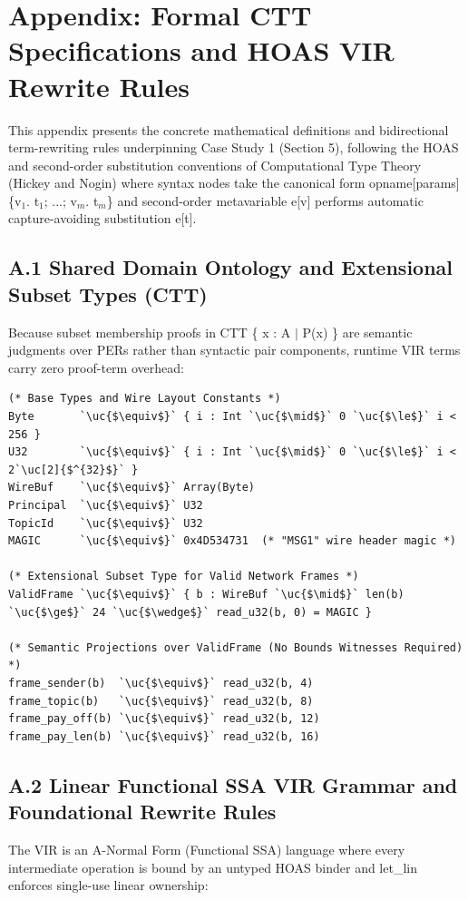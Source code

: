 \section*{Appendix: Formal CTT Specifications and HOAS VIR Rewrite Rules}
This appendix presents the concrete mathematical definitions and bidirectional term-rewriting rules underpinning Case Study 1 (Section 5), following the HOAS and second-order substitution conventions of Computational Type Theory (Hickey and Nogin) where syntax nodes take the canonical form opname[params]\{v\ensuremath{_{1}}. t\ensuremath{_{1}}; ...; v\ensuremath{_{m}}. t\ensuremath{_{m}}\} and second-order metavariable e[v] performs automatic capture-avoiding substitution e[t].


\subsection*{A.1 Shared Domain Ontology and Extensional Subset Types (CTT)}
Because subset membership proofs in CTT \{ x : A \ensuremath{\mid} P(x) \} are semantic judgments over PERs rather than syntactic pair components, runtime VIR terms carry zero proof-term overhead:

\begin{lstlisting}
(* Base Types and Wire Layout Constants *)
Byte       `\uc{$\equiv$}` { i : Int `\uc{$\mid$}` 0 `\uc{$\le$}` i < 256 }
U32        `\uc{$\equiv$}` { i : Int `\uc{$\mid$}` 0 `\uc{$\le$}` i < 2`\uc[2]{$^{32}$}` }
WireBuf    `\uc{$\equiv$}` Array(Byte)
Principal  `\uc{$\equiv$}` U32
TopicId    `\uc{$\equiv$}` U32
MAGIC      `\uc{$\equiv$}` 0x4D534731  (* "MSG1" wire header magic *)

(* Extensional Subset Type for Valid Network Frames *)
ValidFrame `\uc{$\equiv$}` { b : WireBuf `\uc{$\mid$}` len(b) `\uc{$\ge$}` 24 `\uc{$\wedge$}` read_u32(b, 0) = MAGIC }

(* Semantic Projections over ValidFrame (No Bounds Witnesses Required) *)
frame_sender(b)  `\uc{$\equiv$}` read_u32(b, 4)
frame_topic(b)   `\uc{$\equiv$}` read_u32(b, 8)
frame_pay_off(b) `\uc{$\equiv$}` read_u32(b, 12)
frame_pay_len(b) `\uc{$\equiv$}` read_u32(b, 16)
\end{lstlisting}

\subsection*{A.2 Linear Functional SSA VIR Grammar and Foundational Rewrite Rules}
The VIR is an A-Normal Form (Functional SSA) language where every intermediate operation is bound by an untyped HOAS binder and let\_lin enforces single-use linear ownership:

